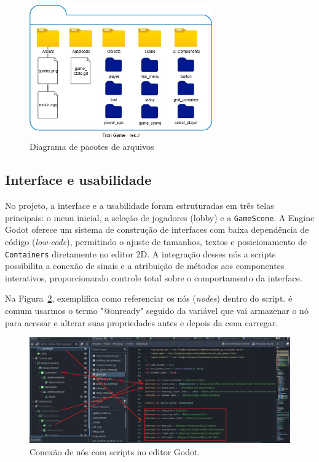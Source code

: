 \begin{figure}[htbp]
    \centering
    \caption{Diagrama de pacotes de arquivos}
    \label{fig:diagrama-arquitetura-arquivos}
    \includegraphics[width=0.7\textwidth]{figuras/diagrama_pacotes.png}
\end{figure}

\subsection{Interface e usabilidade}

No projeto, a interface e a usabilidade foram estruturadas em três telas principais: o menu inicial, a seleção de jogadores (lobby) e a \texttt{GameScene}. A Engine Godot oferece um sistema de construção de interfaces com baixa dependência de código (\textit{low-code}), permitindo o ajuste de tamanhos, textos e posicionamento de \texttt{Containers} diretamente no editor 2D. A integração desses nós a scripts possibilita a conexão de sinais e a atribuição de métodos aos componentes interativos, proporcionando controle total sobre o comportamento da interface.

Na Figura~\ref{fig:conexao-nos}, exemplifica como referenciar os nós (\textit{nodes}) dentro do script. é comum usarmos o termo "@onready" seguido da variável que vai armazenar o nó para acessar e alterar suas propriedades antes e depois da cena carregar.

\begin{figure}[htbp]
    \centering
    \caption{Conexão de nós com scripts no editor Godot.}
    \label{fig:conexao-nos}
    \includegraphics[width=1\textwidth]{figuras/conexoes-nos.png}
\end{figure}


